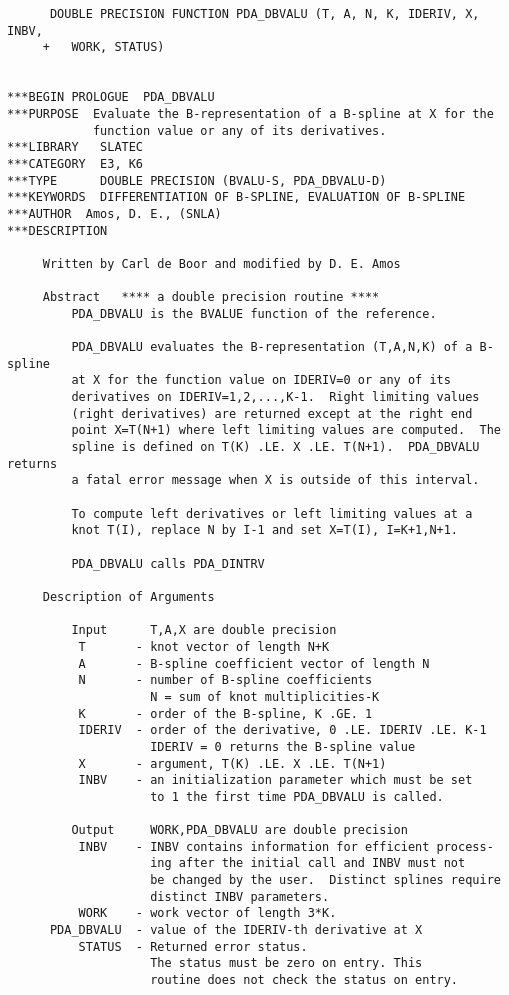 \begin{verbatim}
      DOUBLE PRECISION FUNCTION PDA_DBVALU (T, A, N, K, IDERIV, X, INBV,
     +   WORK, STATUS)


***BEGIN PROLOGUE  PDA_DBVALU
***PURPOSE  Evaluate the B-representation of a B-spline at X for the
            function value or any of its derivatives.
***LIBRARY   SLATEC
***CATEGORY  E3, K6
***TYPE      DOUBLE PRECISION (BVALU-S, PDA_DBVALU-D)
***KEYWORDS  DIFFERENTIATION OF B-SPLINE, EVALUATION OF B-SPLINE
***AUTHOR  Amos, D. E., (SNLA)
***DESCRIPTION

     Written by Carl de Boor and modified by D. E. Amos

     Abstract   **** a double precision routine ****
         PDA_DBVALU is the BVALUE function of the reference.

         PDA_DBVALU evaluates the B-representation (T,A,N,K) of a B-spline
         at X for the function value on IDERIV=0 or any of its
         derivatives on IDERIV=1,2,...,K-1.  Right limiting values
         (right derivatives) are returned except at the right end
         point X=T(N+1) where left limiting values are computed.  The
         spline is defined on T(K) .LE. X .LE. T(N+1).  PDA_DBVALU returns
         a fatal error message when X is outside of this interval.

         To compute left derivatives or left limiting values at a
         knot T(I), replace N by I-1 and set X=T(I), I=K+1,N+1.

         PDA_DBVALU calls PDA_DINTRV

     Description of Arguments

         Input      T,A,X are double precision
          T       - knot vector of length N+K
          A       - B-spline coefficient vector of length N
          N       - number of B-spline coefficients
                    N = sum of knot multiplicities-K
          K       - order of the B-spline, K .GE. 1
          IDERIV  - order of the derivative, 0 .LE. IDERIV .LE. K-1
                    IDERIV = 0 returns the B-spline value
          X       - argument, T(K) .LE. X .LE. T(N+1)
          INBV    - an initialization parameter which must be set
                    to 1 the first time PDA_DBVALU is called.

         Output     WORK,PDA_DBVALU are double precision
          INBV    - INBV contains information for efficient process-
                    ing after the initial call and INBV must not
                    be changed by the user.  Distinct splines require
                    distinct INBV parameters.
          WORK    - work vector of length 3*K.
      PDA_DBVALU  - value of the IDERIV-th derivative at X
          STATUS  - Returned error status.
                    The status must be zero on entry. This
                    routine does not check the status on entry.


\end{verbatim}
